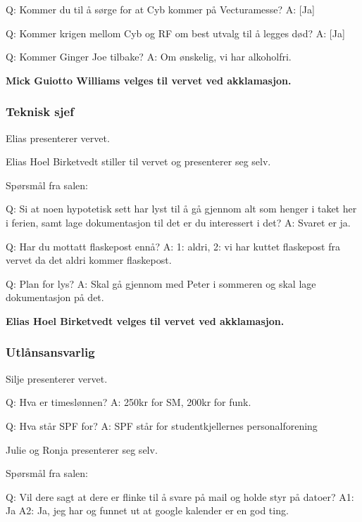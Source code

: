 \documentclass[10pt,norsk,a4paper,usenames,dvipsnames]{article}
\begin{document}
\begin{multicols}{2}
        Q: Kommer du til å sørge for at Cyb kommer på Vecturamesse?
        A: [Ja]

        Q: Kommer krigen mellom Cyb og RF om best utvalg til å legges død?
        A: [Ja]

        Q: Kommer Ginger Joe tilbake?
        A: Om ønskelig, vi har alkoholfri.


         \textbf{Mick Guiotto Williams velges til vervet ved akklamasjon.}


        \subsubsection{Teknisk sjef}
        Elias presenterer vervet.

        Elias Hoel Birketvedt stiller til vervet og presenterer seg selv.

        Spørsmål fra salen:

        Q: Si at noen hypotetisk sett har lyst til å gå gjennom alt som henger i taket her i ferien, samt lage dokumentasjon til det er du interessert i det?
        A: Svaret er ja.

        Q: Har du mottatt flaskepost ennå?
        A: 1: aldri, 2: vi har kuttet flaskepost fra vervet da det aldri kommer flaskepost.

        Q: Plan for lys?
        A: Skal gå gjennom med Peter i sommeren og skal lage dokumentasjon på det.

        \textbf{Elias Hoel Birketvedt velges til vervet ved akklamasjon.}



        \subsubsection{Utlånsansvarlig}
        Silje presenterer vervet.

        Q: Hva er timeslønnen?
        A: 250kr for SM, 200kr for funk.

        Q: Hva står SPF for?
        A: SPF står for studentkjellernes personalforening


        Julie og Ronja presenterer seg selv.

        Spørsmål fra salen:

        Q: Vil dere sagt at dere er flinke til å svare på mail og holde styr på datoer?
        A1: Ja
        A2: Ja, jeg har og funnet ut at google kalender er en god ting.


\end{multicols}
\end{document}
